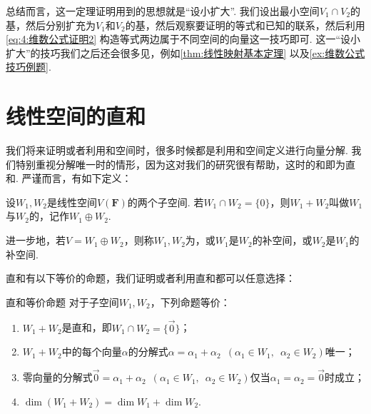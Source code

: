 总结而言，这一定理证明用到的思想就是``设小扩大''. 我们设出最小空间$V_1\cap V_2$的基，然后分别扩充为$V_1$和$V_2$的基，然后观察要证明的等式和已知的联系，然后利用\autoref{eq:4:维数公式证明2} 构造等式两边属于不同空间的向量这一技巧即可. 这一``设小扩大''的技巧我们之后还会很多见，例如\autoref{thm:线性映射基本定理} 以及\autoref{ex:维数公式技巧例题}.

\section{线性空间的直和}

我们将来证明或者利用和空间时，很多时候都是利用和空间定义进行向量分解. 我们特别重视分解唯一时的情形，因为这对我们的研究很有帮助，这时的和即为直和. 严谨而言，有如下定义：
\begin{definition}{}{}
    设$W_1,W_2$是线性空间$V(\mathbf{F})$的两个子空间. 若$W_1 \cap W_2=\{0\}$，则$W_1+W_2$叫做$W_1$与$W_2$的，记作$W_1\oplus W_2$.

    进一步地，若$V=W_1\oplus W_2$，则称$W_1,W_2$为，或$W_1$是$W_2$的补空间，或$W_2$是$W_1$的补空间.
\end{definition}

直和有以下等价的命题，我们证明或者利用直和都可以任意选择：
\begin{theorem}{}{直和等价命题}
    对于子空间$W_1,W_2$，下列命题等价：
    \begin{enumerate}
        \item $W_1+W_2$是直和，即$W_1 \cap W_2=\{\vec{0}\}$；

        \item $W_1+W_2$中的每个向量$\alpha$的分解式$\alpha=\alpha_1+\alpha_2\enspace(\alpha_1\in W_1,\enspace\alpha_2\in W_2)$唯一；

        \item 零向量的分解式$\vec{0}=\alpha_1+\alpha_2 \enspace(\alpha_1\in W_1,\enspace\alpha_2\in W_2)$仅当$\alpha_1=\alpha_2=\vec{0}$时成立；

        \item $\dim (W_1+W_2)=\dim W_1+\dim W_2$.
    \end{enumerate}
\end{theorem}

